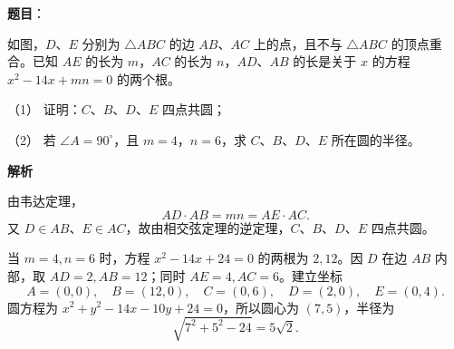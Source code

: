 \begin{answer}

\textbf{题目}：

如图，$D\text{、}E$ 分别为 $\triangle ABC$ 的边 $AB\text{、}AC$ 上的点，且不与 $\triangle ABC$ 的顶点重合。已知 $AE$ 的长为 $m$，$AC$ 的长为 $n$，$AD\text{、}AB$ 的长是关于 $x$ 的方程 $x^2-14x+mn=0$ 的两个根。
\nopagebreak[4]
\begin{center}\end{center}
\nopagebreak[4]
（1） 证明：$C\text{、}B\text{、}D\text{、}E$ 四点共圆；

（2） 若 $\angle A=90^\circ$，且 $m=4$，$n=6$，求 $C\text{、}B\text{、}D\text{、}E$ 所在圆的半径。

\textbf{解析}


由韦达定理，
\nopagebreak[4]
\[
AD\cdot AB=mn=AE\cdot AC.
\]
又 $D\in AB$、$E\in AC$，故由相交弦定理的逆定理，$C\text{、}B\text{、}D\text{、}E$ 四点共圆。


当 $m=4,n=6$ 时，方程 $x^2-14x+24=0$ 的两根为 $2,12$。因 $D$ 在边 $AB$ 内部，取 $AD=2,AB=12$；同时 $AE=4,AC=6$。建立坐标
\nopagebreak[4]
\[
A=(0,0),\quad B=(12,0),\quad C=(0,6),\quad D=(2,0),\quad E=(0,4).
\]
圆方程为 $x^2+y^2-14x-10y+24=0$，所以圆心为 $(7,5)$，半径为
\nopagebreak[4]
\[
\sqrt{7^2+5^2-24}=5\sqrt2.
\]



\end{answer}
